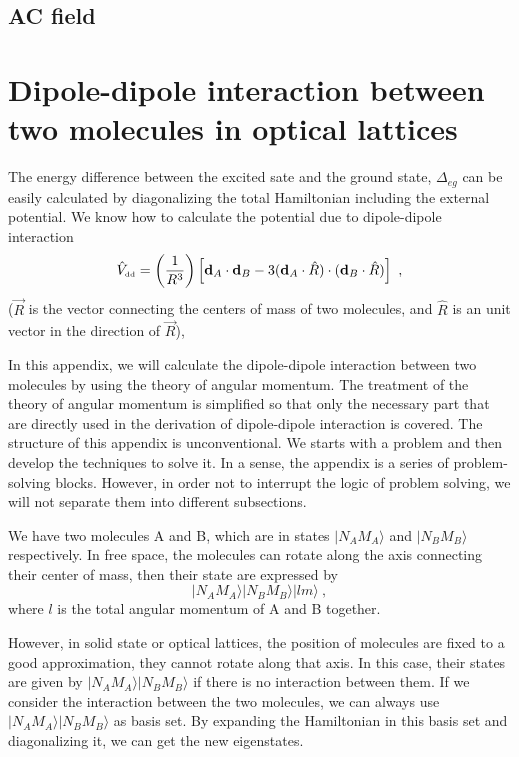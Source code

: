 \subsection{AC field}
\label{sec:acField}



\section{Dipole-dipole interaction between two molecules in optical lattices}
\label{sec::ddInteraction}

The energy difference between the excited sate and the ground state, $\Delta_{eg}$ can be easily calculated by diagonalizing  the total Hamiltonian including the external potential. We know how to calculate the potential due to dipole-dipole interaction 
\begin{equation}
\hat{V}_{\mbox{\tiny dd}} = \left(\frac{1}{R^3}\right)\left[ \mathbf{d}_{A}\cdot\mathbf{d}_{B}-3(\mathbf{d}_{A}\cdot\hat{R})\cdot(\mathbf{d}_{B}\cdot\hat{R})\right] \ , \nonumber
\end{equation}
($\vec{R}$ is the vector connecting the centers of mass of two molecules, and $\hat{R}$ is an unit vector in the direction of $\vec{R}$), 


In this appendix, we will calculate the dipole-dipole interaction between two molecules by using the theory of angular momentum. The treatment of the theory of angular momentum is simplified so that only the necessary part that are directly used in the derivation of dipole-dipole interaction is covered. The structure of this appendix is  unconventional. We starts with a problem and then develop the techniques to solve it. In a sense, the appendix is a series of problem-solving blocks. However, in order not to interrupt the logic of problem solving, we will not separate them into different subsections. 

We have two molecules A and B, which are in states $|N_{A}M_{A}\rangle$ and $|N_{B}M_{B}\rangle$ respectively. In free space, the molecules can rotate along the axis connecting their center of mass, then their state are expressed by
\begin{equation}
|N_{A}M_{A}\rangle |N_{B}M_{B}\rangle |lm\rangle  \ , \nonumber
\end{equation}
where $l$ is the total angular momentum of A and B together. 

However, in solid state or optical lattices, the position of molecules are fixed to a good approximation, they cannot rotate along that axis. In this case, their states are given by $|N_{A}M_{A}\rangle |N_{B}M_{B}\rangle$ if there is no interaction between them. If we consider the interaction between the two molecules, we can always use $|N_{A}M_{A}\rangle |N_{B}M_{B}\rangle$ as basis set. By expanding the Hamiltonian in this basis set and diagonalizing it, we can get the new eigenstates.


